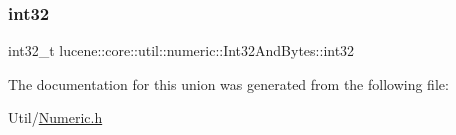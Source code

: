 \subsubsection{\texorpdfstring{int32}{int32}}
{\footnotesize\ttfamily int32\+\_\+t lucene\+::core\+::util\+::numeric\+::\+Int32\+And\+Bytes\+::int32}



The documentation for this union was generated from the following file\+:\begin{DoxyCompactItemize}
\item 
Util/\mbox{\hyperlink{Numeric_8h}{Numeric.\+h}}\end{DoxyCompactItemize}
